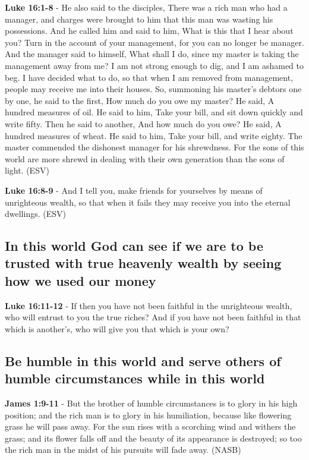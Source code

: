 \documentclass[11pt]{article}
\begin{document}
\textbf{Luke 16:1-8} - He also said to the disciples, There was a rich man who had a manager, and charges were brought to him that this man was wasting his possessions. And he called him and said to him, What is this that I hear about you? Turn in the account of your management, for you can no longer be manager. And the manager said to himself, What shall I do, since my master is taking the management away from me? I am not strong enough to dig, and I am ashamed to beg. I have decided what to do, so that when I am removed from management, people may receive me into their houses. So, summoning his master's debtors one by one, he said to the first, How much do you owe my master? He said, A hundred measures of oil. He said to him, Take your bill, and sit down quickly and write fifty. Then he said to another, And how much do you owe? He said, A hundred measures of wheat. He said to him, Take your bill, and write eighty. The master commended the dishonest manager for his shrewdness. For the sons of this world are more shrewd in dealing with their own generation than the sons of light. (ESV)

\textbf{Luke 16:8-9} - And I tell you, make friends for yourselves by means of unrighteous wealth, so that when it fails they may receive you into the eternal dwellings. (ESV)

\subsection{In this world God can see if we are to be trusted with true heavenly wealth by seeing how we used our money}
\label{sec:orgd8ead2a}
\textbf{Luke 16:11-12} - If then you have not been faithful in the unrighteous wealth, who will entrust to you the true riches? And if you have not been faithful in that which is another's, who will give you that which is your own?

\subsection{Be humble in this world and serve others of humble circumstances while in this world}
\label{sec:orgcbfb4c3}
\textbf{James 1:9-11} - But the brother of humble circumstances is to glory in his high position; and the rich man is to glory in his humiliation, because like flowering grass he will pass away. For the sun rises with a scorching wind and withers the grass; and its flower falls off and the beauty of its appearance is destroyed; so too the rich man in the midst of his pursuits will fade away. (NASB)
\end{document}
